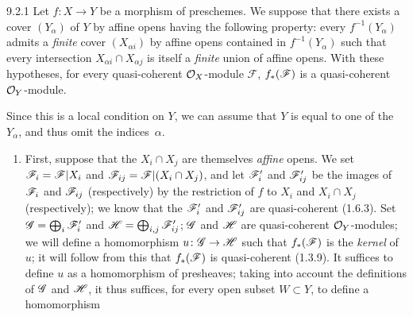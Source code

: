 \documentclass[../main.tex]{subfiles}
\begin{document}
\begin{cx}[Proposition]{9.2.1}
    Let $f\colon X\to Y$ be a morphism of preschemes.
    We suppose that there exists a cover $(Y_\alpha)$ of $Y$ by affine opens having the following property: every $f^{-1}(Y_\alpha)$ admits a \emph{finite} cover $(X_{\alpha i})$ by affine opens contained in $f^{-1}(Y_\alpha)$ such that every intersection $X_{\alpha i}\cap X_{\alpha j}$ is itself a \emph{finite} union of affine opens.
    With these hypotheses, for every quasi-coherent $\mathcal{O}_X$-module $\mathscr{F}$, $f_*(\mathscr{F})$ is a quasi-coherent $\mathcal{O}_Y$-module.
\end{cx}

Since this is a local condition on $Y$, we can assume that $Y$ is equal to one of the $Y_\alpha$, and thus omit the indices~$\alpha$.

\begin{enumerate}[label=\alph*)]
    \item First, suppose that the $X_i\cap X_j$ are themselves \emph{affine} opens.
        We set $\mathscr{F}_i=\mathscr{F}|X_i$ and $\mathscr{F}_{ij}=\mathscr{F}|(X_i\cap X_j)$, and let $\mathscr{F}'_i$ and $\mathscr{F}'_{ij}$ be the images of $\mathscr{F}_i$ and $\mathscr{F}_{ij}$ (respectively) by the restriction of $f$ to $X_i$ and $X_i\cap X_j$ (respectively); we know that the $\mathscr{F}'_i$ and $\mathscr{F}'_{ij}$ are quasi-coherent (1.6.3).
        Set $\mathscr{G}=\bigoplus_i\mathscr{F}'_i$ and $\mathscr{H}=\bigoplus_{i,j}\mathscr{F}'_{ij}$; $\mathscr{G}$ and $\mathscr{H}$ are quasi-coherent $\mathcal{O}_Y$-modules; we will define a homomorphism $u\colon\mathscr{G}\to\mathscr{H}$ such that $f_*(\mathscr{F})$ is the \emph{kernel} of $u$; it will follow from this that $f_*(\mathscr{F})$ is quasi-coherent (1.3.9).
        It suffices to define $u$ as a homomorphism of presheaves; taking into account the definitions of $\mathscr{G}$ and $\mathscr{H}$, it thus suffices, for every open subset $W\subset Y$, to define a homomorphism
\end{enumerate}
\end{document}
